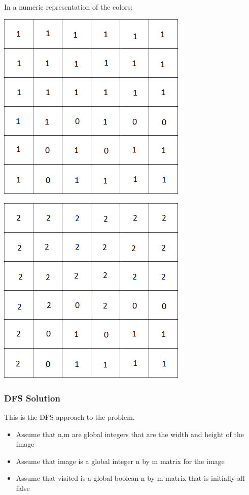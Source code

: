 \documentclass[11pt,oneside]{book}
\makeatletter
\def\maxwidth#1{\ifdim\Gin@nat@width>#1 #1\else\Gin@nat@width\fi}
\makeatother
\begin{document}
In a numeric representation of the colors:

\includegraphics[width=\maxwidth{\textwidth}]{bucket3.png}

\includegraphics[width=\maxwidth{\textwidth}]{bucket4.png}

\subsubsection{DFS Solution}

This is the DFS approach to the problem.

\begin{itemize}
\item Assume that n,m are global integers that are the width and height of the image
\item Assume that image is a global integer n by m matrix for the image
\item Assume that visited is a global boolean n by m matrix that is initially all false
\end{itemize}
\end{document}
